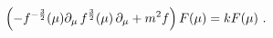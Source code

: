 \begin{equation}
\left(-f^{-{3\over2}}(\mu)
\partial_\mu \, f^{{3\over 2}}(\mu)\,\partial_\mu + m^2f \right)
F(\mu)=k F(\mu)
\ .
\label{gegen}
\end{equation}

